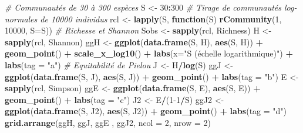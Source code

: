 \documentclass[
  11pt,
  french,
  a4paper,
  extrafontsizes,onecolumn,openright
  ]{memoir}
\newenvironment{Shaded}{\begin{snugshade}}{\end{snugshade}}
\newcommand{\AttributeTok}[1]{\textcolor[rgb]{0.13,0.29,0.53}{#1}}
\newcommand{\CommentTok}[1]{\textcolor[rgb]{0.56,0.35,0.01}{\textit{#1}}}
\newcommand{\ControlFlowTok}[1]{\textcolor[rgb]{0.13,0.29,0.53}{\textbf{#1}}}
\newcommand{\DecValTok}[1]{\textcolor[rgb]{0.00,0.00,0.81}{#1}}
\newcommand{\FunctionTok}[1]{\textcolor[rgb]{0.13,0.29,0.53}{\textbf{#1}}}
\newcommand{\NormalTok}[1]{#1}
\newcommand{\OtherTok}[1]{\textcolor[rgb]{0.56,0.35,0.01}{#1}}
\newcommand{\SpecialCharTok}[1]{\textcolor[rgb]{0.81,0.36,0.00}{\textbf{#1}}}
\newcommand{\StringTok}[1]{\textcolor[rgb]{0.31,0.60,0.02}{#1}}
\begin{document}
\begin{Shaded}
\begin{Highlighting}[]
\CommentTok{\# Communautés de 30 à 300 espèces}
\NormalTok{S }\OtherTok{\textless{}{-}} \DecValTok{30}\SpecialCharTok{:}\DecValTok{300}
\CommentTok{\# Tirage de communautés log{-}normales de 10000 individus}
\NormalTok{rcl }\OtherTok{\textless{}{-}} \FunctionTok{lapply}\NormalTok{(S, }\ControlFlowTok{function}\NormalTok{(S) }\FunctionTok{rCommunity}\NormalTok{(}\DecValTok{1}\NormalTok{, }\DecValTok{10000}\NormalTok{, }\AttributeTok{S=}\NormalTok{S))}
\CommentTok{\# Richesse et Shannon}
\NormalTok{Sobs }\OtherTok{\textless{}{-}} \FunctionTok{sapply}\NormalTok{(rcl, Richness)}
\NormalTok{H }\OtherTok{\textless{}{-}} \FunctionTok{sapply}\NormalTok{(rcl, Shannon)}
\NormalTok{ggH }\OtherTok{\textless{}{-}} \FunctionTok{ggplot}\NormalTok{(}\FunctionTok{data.frame}\NormalTok{(S, H), }\FunctionTok{aes}\NormalTok{(S, H)) }\SpecialCharTok{+}
  \FunctionTok{geom\_point}\NormalTok{() }\SpecialCharTok{+} \FunctionTok{scale\_x\_log10}\NormalTok{() }\SpecialCharTok{+} 
  \FunctionTok{labs}\NormalTok{(}\AttributeTok{x=}\StringTok{"S (échelle logarithmique)"}\NormalTok{) }\SpecialCharTok{+}
  \FunctionTok{labs}\NormalTok{(}\AttributeTok{tag =} \StringTok{"a"}\NormalTok{)}
\CommentTok{\# Equitabilité de Pielou}
\NormalTok{J }\OtherTok{\textless{}{-}}\NormalTok{ H}\SpecialCharTok{/}\FunctionTok{log}\NormalTok{(S)}
\NormalTok{ggJ }\OtherTok{\textless{}{-}} \FunctionTok{ggplot}\NormalTok{(}\FunctionTok{data.frame}\NormalTok{(S, J), }\FunctionTok{aes}\NormalTok{(S, J)) }\SpecialCharTok{+}
  \FunctionTok{geom\_point}\NormalTok{() }\SpecialCharTok{+} \FunctionTok{labs}\NormalTok{(}\AttributeTok{tag =} \StringTok{"b"}\NormalTok{)}
\NormalTok{E }\OtherTok{\textless{}{-}} \FunctionTok{sapply}\NormalTok{(rcl, Simpson)}
\NormalTok{ggE }\OtherTok{\textless{}{-}} \FunctionTok{ggplot}\NormalTok{(}\FunctionTok{data.frame}\NormalTok{(S, E), }\FunctionTok{aes}\NormalTok{(S, E)) }\SpecialCharTok{+}
  \FunctionTok{geom\_point}\NormalTok{() }\SpecialCharTok{+} \FunctionTok{labs}\NormalTok{(}\AttributeTok{tag =} \StringTok{"c"}\NormalTok{)}
\NormalTok{J2 }\OtherTok{\textless{}{-}}\NormalTok{ E}\SpecialCharTok{/}\NormalTok{(}\DecValTok{1{-}1}\SpecialCharTok{/}\NormalTok{S)}
\NormalTok{ggJ2 }\OtherTok{\textless{}{-}} \FunctionTok{ggplot}\NormalTok{(}\FunctionTok{data.frame}\NormalTok{(S, J2), }\FunctionTok{aes}\NormalTok{(S, J2)) }\SpecialCharTok{+}
  \FunctionTok{geom\_point}\NormalTok{() }\SpecialCharTok{+} \FunctionTok{labs}\NormalTok{(}\AttributeTok{tag =} \StringTok{"d"}\NormalTok{)}
\FunctionTok{grid.arrange}\NormalTok{(ggH, ggJ, ggE , ggJ2, }\AttributeTok{ncol =} \DecValTok{2}\NormalTok{, }\AttributeTok{nrow =} \DecValTok{2}\NormalTok{)}
\end{Highlighting}
\end{Shaded}
\end{document}
